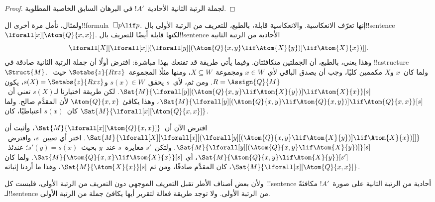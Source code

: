 \documentclass[../../../include/open-logic-section]{subfiles}
\begin{document}
\begin{proof}
  لجملة الرتبة الثانية الأحادية~$!A'$ في البرهان السابق الخاصية
  المطلوبة.
\end{proof}

ولمثال، تأمل مرة أخرى ال!!{formula}~$\Box p \lif p$. إنها تعرّف
الانعكاسية. والانعكاسية قابلة، بالطبع، للتعريف من الرتبة الأولى
بال!!{sentence}~$\lforall[x][\Atom{Q}{x,x}]$. لكنها قابلة أيضًا
للتعريف بال!!{sentence} الأحادية من الرتبة الثانية
\[
\lforall[X][\lforall[x][(\lforall[y][(\Atom{Q}{x,y} \lif \Atom{X}{y})]
    \lif \Atom{X}{x})]].
\]
وهذا يعني، بالطبع، أن الجملتين متكافئتان. وفيما يأتي طريقة قد تقنعك
بهذا مباشرة: افترض أولًا أن جملة الرتبة الثانية صادقة في
!!a{structure}~$\Struct{M}$. ولما كان~$x$ و$X$ مكممين كليًا، وجب أن
يصدق الباقي لأي~$x \in W$ ومجموعة~$X \subseteq W$، ومنها مثلًا
المجموعة~$\Setabs{z}{Rxz}$ حيث~$R = \Assign{Q}{M}$. ومن ثم، لأي~$s$
يحقق~$s(x) \in W$ و$s(X) = \Setabs{z}{Rxz}$، يكون
$\Sat{M}{\lforall[y][(\Atom{Q}{x,y} \lif
    \Atom{X}{y})] \lif \Atom{X}{x}}[s]$. لكن طريقة اختيارنا لـ$s(X)$
تعني أن~$\Sat{M}{\lforall[y][(\Atom{Q}{x,y} \lif
    \Atom{Q}{x,y})] \lif \Atom{Q}{x,x}}[s]$، وهذا يكافئ
$\Atom{Q}{x,x}$ لأن المقدَّم صالح. ولما كان~$s(x)$ اعتباطيًا، كان
$\Sat{M}{\lforall[x][\Atom{Q}{x,x}]}$.

افترض الآن أن~$\Sat{M}{\lforall[x][\Atom{Q}{x,x}]}$، وأثبت أن
$\Sat{M}{\lforall[X][\lforall[x][(\lforall[y][(\Atom{Q}{x,y} \lif
        \Atom{X}{y})] \lif \Atom{X}{x})]]}$. اختر أي تعيين~$s$،
وافترض~$\Sat{M}{\lforall[y][(\Atom{Q}{x,y} \lif
    \Atom{X}{y})]}[s]$. ولتكن~$s'$ مغايرة~$s$ عند~$y$ بحيث~$s'(y)
= s(x)$؛ عندئذ~$\Sat{M}{\Atom{Q}{x,y} \lif \Atom{X}{y}}[s']$، أي
$\Sat{M}{\Atom{Q}{x,x} \lif \Atom{X}{x}}[s]$. ولما كان
$\Sat{M}{\lforall[x][\Atom{Q}{x,x}]}$، كان المقدَّم صادقًا، ومن ثم
$\Sat{M}{\Atom{X}{x}}[s]$، وهذا ما أردنا إثباته.

ولأن بعض أصناف الأطر تقبل التعريف الموجهي دون التعريف من الرتبة
الأولى، فليست كل~!!{sentence} أحادية من الرتبة الثانية على صورة~$!A'$
مكافئةً لـ!!{sentence} من الرتبة الأولى. ولا توجد طريقة فعالة لتقرير
أيها يكافئ جملة من الرتبة الأولى.
\end{document}
